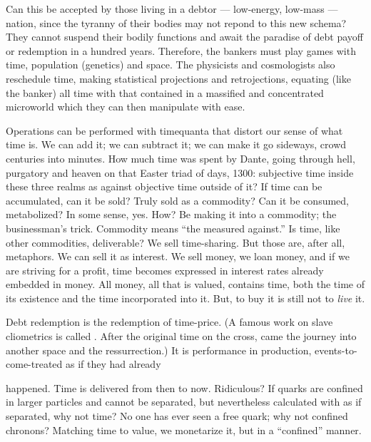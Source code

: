 \documentclass[11pt,twoside,draft]{memoir}
\begin{document}
Can this be accepted by those living
in a debtor --- low-energy, low-mass --- nation,
since the tyranny of their bodies may not
repond to this new schema? They cannot
suspend their bodily functions and await the
paradise of debt payoff or redemption in a
hundred years. Therefore, the bankers must
play games with time, population (genetics)
and space. The physicists and cosmologists
also reschedule time, making statistical projections and retrojections, equating (like the
banker) all time with that contained in
a massified and concentrated microworld
which they can then manipulate with ease.

Operations can be performed with timequanta that distort our sense of what time is.
We can add it; we can subtract it; we can
make it go sideways, crowd centuries into
minutes. How much time was spent by
Dante, going through hell, purgatory and
heaven on that Easter triad of days, 1300:
subjective time inside these three realms as
against objective time outside of it? If time
can be accumulated, can it be sold? Truly
sold as a commodity? Can it be consumed,
metabolized? In some sense, yes. How? Be %
making it into a commodity; the businessman's trick. Commodity means \enquote{the measured against.} Is time, like other commodities, deliverable? We sell time-sharing. But those are, after all, metaphors. We can sell it
as interest. We sell money, we loan money,
and if we are striving for a profit, time
becomes expressed in interest rates already
embedded in money. All money, all that is
valued, contains time, both the time of its
existence and the time incorporated into it.
But, to buy it is still not to \emph{live} it.

Debt redemption is the redemption of
time-price. (A famous work on slave cliometrics is called . After the original time on the cross, came the
journey into another space and the ressurrection.) It is performance in production,
events-to-come-treated as if they had already

happened. Time is delivered from then to
now. Ridiculous? If quarks are confined in
larger particles and cannot be separated, but
nevertheless calculated with as if separated,
why not time? No one has ever seen a free
quark; why not confined chronons? Matching time to value, we monetarize it, but in a
\enquote{confined} manner.
\end{document}
